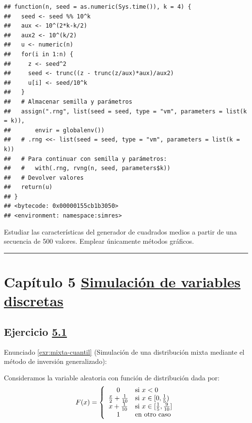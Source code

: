 \documentclass[
]{book}
\theoremstyle{break}
\theoremstyle{nonumberplain}
\begin{document}
\begin{verbatim}
## function(n, seed = as.numeric(Sys.time()), k = 4) {
##   seed <- seed %% 10^k
##   aux <- 10^(2*k-k/2)
##   aux2 <- 10^(k/2)
##   u <- numeric(n)
##   for(i in 1:n) {
##     z <- seed^2
##     seed <- trunc((z - trunc(z/aux)*aux)/aux2)
##     u[i] <- seed/10^k
##   }
##   # Almacenar semilla y parámetros
##   assign(".rng", list(seed = seed, type = "vm", parameters = list(k = k)),
##       envir = globalenv())
##   # .rng <<- list(seed = seed, type = "vm", parameters = list(k = k))
##   # Para continuar con semilla y parámetros:
##   #   with(.rng, rvng(n, seed, parameters$k))
##   # Devolver valores
##   return(u)
## }
## <bytecode: 0x00000155cb1b3050>
## <environment: namespace:simres>
\end{verbatim}

Estudiar las características del generador de cuadrados medios a partir de una secuencia de 500 valores.
Emplear únicamente métodos gráficos.

\begin{center}\rule{0.5\linewidth}{0.5pt}\end{center}

\hypertarget{capuxedtulo-5-simulaciuxf3n-de-variables-discretas}{%
\section{\texorpdfstring{Capítulo 5 \href{discretas.html}{Simulación de variables discretas}}{Capítulo 5 Simulación de variables discretas}}\label{capuxedtulo-5-simulaciuxf3n-de-variables-discretas}}

\hypertarget{sol-mixta-cuantil}{%
\subsection{\texorpdfstring{Ejercicio \href{ejercicios-discretas.html\#exr:mixta-cuantil}{5.1}}{Ejercicio 5.1}}\label{sol-mixta-cuantil}}

Enunciado \ref{exr:mixta-cuantil} (Simulación de una distribución mixta mediante el método de inversión generalizado):

Consideramos la variable aleatoria con función de distribución dada por:
\[F(x)=\left\{
\begin{array}
[c]{cl}0 & \mbox{si $x<0$}\\
\frac{x}{2}+\frac{1}{10} & \mbox{si $x\in[0,\frac{1}{5})$}\\
x+\frac{1}{10} & \mbox{si $x\in[\frac{1}{5},\frac{9}{10}]$}\\
1 & \mbox{en otro caso}
\end{array}
\right.\]
\end{document}
